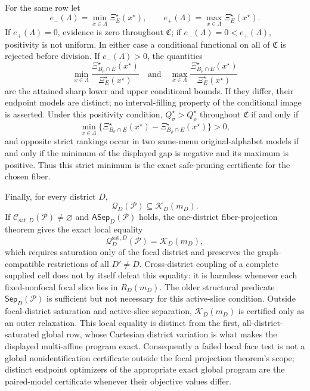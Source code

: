 For the same row let
\[
e_-(\Lambda)=\min_{x\in\Lambda}\Xi_E^\star(x^\star),
\qquad
e_+(\Lambda)=\max_{x\in\Lambda}\Xi_E^\star(x^\star).
\]
If \(e_+(\Lambda)=0\), evidence is zero throughout \(\mathfrak C\); if \(e_-(\Lambda)=0<e_+(\Lambda)\), positivity is not uniform. In either case a conditional functional on all of \(\mathfrak C\) is rejected before division. If \(e_-(\Lambda)>0\), the quantities
\[
\min_{x\in\Lambda}
\frac{\Xi_{B_\rho\cap E}^\star(x^\star)}{\Xi_E^\star(x^\star)}
\quad\text{and}\quad
\max_{x\in\Lambda}
\frac{\Xi_{B_\rho\cap E}^\star(x^\star)}{\Xi_E^\star(x^\star)}
\]
are the attained sharp lower and upper conditional bounds. If they differ, their endpoint models are distinct; no interval-filling property of the conditional image is asserted. Under this positivity condition, \(Q_\sigma^\star>Q_\rho^\star\) throughout \(\mathfrak C\) if and only if
\[
\min_{x\in\Lambda}
\{\Xi_{B_\sigma\cap E}^\star(x^\star)-\Xi_{B_\rho\cap E}^\star(x^\star)\}>0,
\]
and opposite strict rankings occur in two same-menu original-alphabet models if and only if the minimum of the displayed gap is negative and its maximum is positive. Thus this strict minimum is the exact safe-pruning certificate for the chosen fiber.

Finally, for every district \(D\),
\[
\mathcal Q_D(\mathcal P)\subseteq\mathcal K_D(m_D).
\]
If \(\mathcal C_{\mathrm{sat},D}(\mathcal P)\ne\varnothing\) and \(\mathsf{ASep}_D(\mathcal P)\) holds, the one-district fiber-projection theorem gives the exact local equality
\[
\mathcal Q_D^{\mathrm{sat},D}(\mathcal P)=\mathcal K_D(m_D),
\]
which requires saturation only of the focal district and preserves the graph-compatible restrictions of all \(D'\ne D\). Cross-district coupling of a complete supplied cell does not by itself defeat this equality: it is harmless whenever each fixed-nonfocal focal slice lies in \(R_D(m_D)\). The older structural predicate \(\mathsf{Sep}_D(\mathcal P)\) is sufficient but not necessary for this active-slice condition. Outside focal-district saturation and active-slice separation, \(\mathcal K_D(m_D)\) is certified only as an outer relaxation. This local equality is distinct from the first, all-district-saturated global row, whose Cartesian district variation is what makes the displayed multi-affine program exact. Consequently a failed local face test is not a global nonidentification certificate outside the focal projection theorem's scope; distinct endpoint optimizers of the appropriate exact global program are the paired-model certificate whenever their objective values differ.